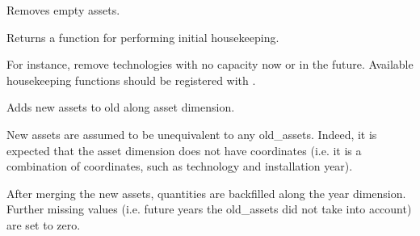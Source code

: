\documentclass[letterpaper,10pt,english]{sphinxmanual}
\begin{document}

\begin{fulllineitems}
\label{\detokenize{api:muse.hooks.clean}}
Removes empty assets.

\end{fulllineitems}


\begin{fulllineitems}
\label{\detokenize{api:muse.hooks.housekeeping_factory}}
Returns a function for performing initial housekeeping.

For instance, remove technologies with no capacity now or in the future.
Available housekeeping functions should be registered with
.

\end{fulllineitems}


\begin{fulllineitems}
\label{\detokenize{api:muse.hooks.merge_assets}}
Adds new assets to old along asset dimension.

New assets are assumed to be unequivalent to any old\_assets. Indeed,
it is expected that the asset dimension does not have coordinates (i.e.
it is a combination of coordinates, such as technology and installation
year).

After merging the new assets, quantities are back\sphinxhyphen{}filled along the year
dimension. Further missing values (i.e. future years the old\_assets
did not take into account) are set to zero.

\end{fulllineitems}
\end{document}
